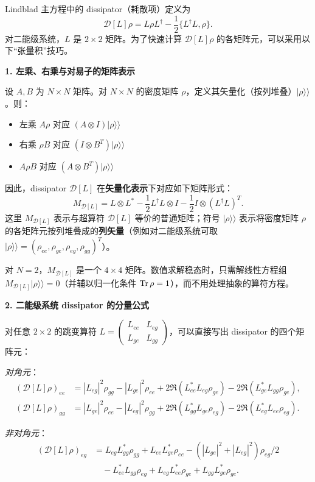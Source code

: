 Lindblad 主方程中的 dissipator（耗散项）定义为
\[
\mathcal{D}[L]\rho = L\rho L^\dagger - \frac{1}{2}\{L^\dagger L, \rho\}.
\]
对二能级系统，$L$ 是 $2\times 2$ 矩阵。为了快速计算 $\mathcal{D}[L]\rho$ 的各矩阵元，可以采用以下``张量积''技巧。

\textbf{1. 左乘、右乘与对易子的矩阵表示}

设 $A, B$ 为 $N\times N$ 矩阵。对 $N\times N$ 的密度矩阵 $\rho$，定义其矢量化（按列堆叠）$|\rho\rangle\rangle$。则：
\begin{itemize}[nosep]
    \item 左乘 $A\rho$ 对应 $(A \otimes I)|\rho\rangle\rangle$
    \item 右乘 $\rho B$ 对应 $(I \otimes B^T)|\rho\rangle\rangle$
    \item $A\rho B$ 对应 $(A \otimes B^T)|\rho\rangle\rangle$
\end{itemize}
因此，dissipator $\mathcal{D}[L]$ 在\textbf{矢量化表示}下对应如下矩阵形式：
\[
M_{\mathcal{D}[L]} = L \otimes L^* - \frac{1}{2} L^\dagger L \otimes I - \frac{1}{2} I \otimes (L^\dagger L)^T.
\]
这里 $M_{\mathcal{D}[L]}$ 表示与超算符 $\mathcal{D}[L]$ 等价的普通矩阵；符号 $|\rho\rangle\rangle$ 表示将密度矩阵 $\rho$ 的各矩阵元按列堆叠成的\textbf{列矢量}（例如对二能级系统可取 $|\rho\rangle\rangle = (\rho_{ee}, \rho_{ge}, \rho_{eg}, \rho_{gg})^T$）。

对 $N=2$，$M_{\mathcal{D}[L]}$ 是一个 $4\times 4$ 矩阵。数值求解稳态时，只需解线性方程组 $M_{\mathcal{D}[L]}|\rho\rangle\rangle = 0$（并辅以归一化条件 $\Tr\rho=1$），而不用处理抽象的算符方程。

\textbf{2. 二能级系统 dissipator 的分量公式}

对任意 $2\times 2$ 的跳变算符 $L = \begin{pmatrix} L_{ee} & L_{eg} \\ L_{ge} & L_{gg} \end{pmatrix}$，可以直接写出 dissipator 的四个矩阵元：

\textit{对角元}：
\begin{align*}
(\mathcal{D}[L]\rho)_{ee} &= |L_{eg}|^2 \rho_{gg} - |L_{ge}|^2 \rho_{ee} + 2\Re(L_{ee}^* L_{eg} \rho_{ge}) - 2\Re(L_{ge}^* L_{gg} \rho_{ge}), \\
(\mathcal{D}[L]\rho)_{gg} &= |L_{ge}|^2 \rho_{ee} - |L_{eg}|^2 \rho_{gg} + 2\Re(L_{gg}^* L_{ge} \rho_{eg}) - 2\Re(L_{eg}^* L_{ee} \rho_{eg}).
\end{align*}

\textit{非对角元}：
\begin{align*}
(\mathcal{D}[L]\rho)_{eg} &= L_{eg}L_{gg}^* \rho_{gg} + L_{ee}L_{ge}^* \rho_{ee} - (|L_{ge}|^2+|L_{eg}|^2)\rho_{eg}/2 \\
&\quad - L_{ee}^* L_{gg} \rho_{eg} + L_{eg}L_{ee}^* \rho_{ge} + L_{gg}L_{ge}^* \rho_{ge}.
\end{align*}

